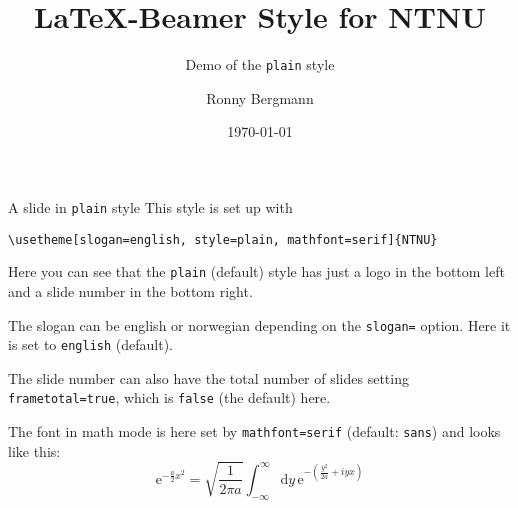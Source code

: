 \documentclass[aspectratio=169]{beamer}
\title{\LaTeX{}-Beamer Style for NTNU}
\subtitle{Demo of the  \texttt{plain} style}
\author{Ronny Bergmann}
\date{\today}
\begin{document}
	\maketitle
    \begin{frame}[fragile]{A slide in \texttt{plain} style}
        This style is set up with

        \lstinline!\usetheme[slogan=english, style=plain, mathfont=serif]{NTNU}!

        Here you can see that the \texttt{plain} (default) style has just a logo in the bottom left and a slide number in the bottom right.

        The slogan can be english or norwegian depending on the \lstinline!slogan=! option. Here it is set to \lstinline!english! (default).

        The slide number can also have the total number of slides setting \lstinline!frametotal=true!, which is \lstinline!false! (the default) here.
        
        The font in math mode is here set by \lstinline!mathfont=serif! (default: \lstinline!sans!) and looks like this: \[\mathrm{e}^{-\frac{a}{2}x^2} = \sqrt{\frac{1}{2\pi a}} \int_{-\infty}^\infty\mathrm{d}y\, \mathrm{e}^{-\left(\frac{y^2}{2a} +iy x\right)}\]
    \end{frame}
\end{document}
